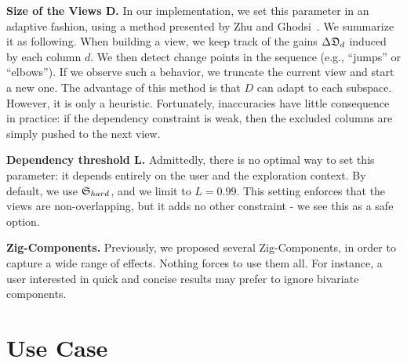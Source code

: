 \textbf{Size of the Views D.} In our implementation, we set this parameter in
an adaptive fashion, using a method presented by Zhu and
Ghodsi~\cite{zhu2006automatic}.  We summarize it as following. When building
a view, we keep track of the gains $\Delta\mathfrak{D}_d$ induced by each column $d$.
We then detect change points in the sequence (e.g., ``jumps'' or ``elbows'').
If we observe such a behavior, we truncate the current view and start a new
one.  The advantage of this method is that $D$ can adapt to each subspace.
However, it is only a heuristic. Fortunately, inaccuracies have little
consequence in practice: if the dependency constraint is weak, then the
excluded columns are simply pushed to the next view.

\textbf{Dependency threshold L.} Admittedly, there is no optimal way to set
this parameter: it depends entirely on the user and the exploration context. By
default, we use $\mathfrak{S}_{hard}$, and we limit to $L=0.99$. This setting
enforces that the views are non-overlapping, but it adds no other constraint -
we see this as a safe option.

\textbf{Zig-Components.} Previously, we proposed several Zig-Components, in
order to capture a wide range of effects. Nothing forces to use
them all. For instance, a user interested in quick and concise results may
prefer to ignore bivariate components.


\section{Use Case}
\label{sec:usecase}

